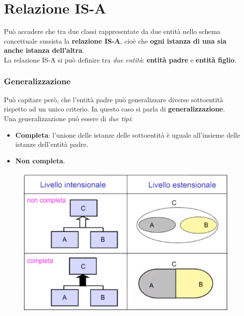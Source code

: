 \documentclass[12pt, a4paper]{article}
\begin{document}
    \section{Relazione IS-A}
    Può accadere che tra due classi rappresentate da due entità nello schema concettuale sussista la 
    \textbf{relazione IS-A}, cioè che \textbf{ogni istanza di una sia anche istanza dell'altra}.
    \\La relazione IS-A si può definire tra \textit{due entità}: \textbf{entità padre} e \textbf{entità figlio}.

    \newpage
    \subsubsection{Generalizzazione}
    Può capitare però, che l'entità padre può generalizzare diverse sottoentità rispetto ad un unico criterio. 
    In questo caso si parla di \textbf{generalizzazione}.
    \\Una generalizzazione può essere di \textit{due tipi}:
    \begin{itemize}
        \item \textbf{Completa}: l'unione delle istanze delle sottoentità è uguale all'insieme delle istanze dell'entità padre.
        \item \textbf{Non completa}.
    \end{itemize}

    \begin{figure}[htbp]
        \centering
        \includegraphics[scale=0.7]{generalizzazione.png}
        
        \label{<label>}
    \end{figure}
\end{document}
